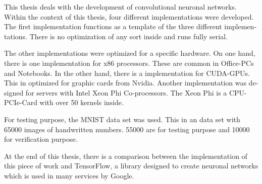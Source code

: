 \documentclass[../main.tex]{subfiles}
\begin{document}
\begin{otherlanguage}{english}
This thesis deals with the development of convolutional neuronal networks. Within the context of this thesis, four different implementations were developed. The first implementation functions as a template of the three different implementations. There is no optimization of any sort inside and runs fully serial.

The other implementations were optimized for a specific hardware. On one hand, there is one implementation for x86 processors. These are common in Office-PCs and Notebooks. In the other hand, there is a implementation for CUDA-GPUs. This in optimized for graphic cards from Nvidia. Another implementation was designed for servers with Intel Xeon Phi Co-processors. The Xeon Phi is a CPU-PCIe-Card with over 50 kernels inside.

For testing purpose, the MNIST data set was used. This in an data set with 65000 images of handwritten numbers. 55000 are for testing purpose and 10000 for verification purpose.

At the end of this thesis, there is a comparison between the implementation of this piece of work and TensorFlow, a library designed to create neuronal networks which is used in many services by Google.
\end{otherlanguage}
\end{document}
